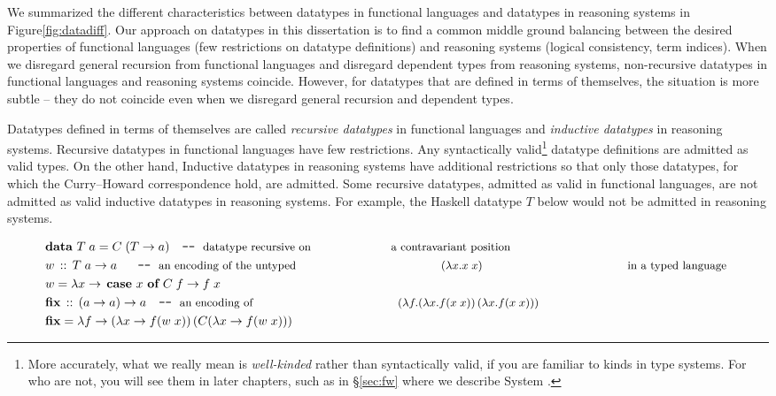 We summarized the different characteristics between datatypes
in functional languages and datatypes in reasoning systems
in Figure\;\ref{fig:datadiff}. Our approach on datatypes
in this dissertation is to find a common middle ground
balancing between the desired properties of functional languages
(few restrictions on datatype definitions) and reasoning systems
(logical consistency, term indices). When we disregard general recursion
from functional languages and disregard dependent types from reasoning systems,
non-recursive datatypes in functional languages and reasoning systems coincide. However, for datatypes that are defined in terms of themselves, the situation
is more subtle -- they do not coincide even when we disregard general recursion
and dependent types.

Datatypes defined in terms of themselves are called \emph{recursive datatypes}
in functional languages and \emph{inductive datatypes} in reasoning systems.
Recursive datatypes in functional languages have few restrictions.
Any syntactically valid\footnote{
	More accurately, what we really mean is \emph{well-kinded} rather than
	syntactically valid, if you are familiar to kinds in type systems.
	For who are not, you will see them in later chapters, such as
	in \S\ref{sec:fw} where we describe System \Fw.}
datatype definitions are admitted as valid types. On the other hand,
Inductive datatypes in reasoning systems have additional restrictions so that
only those datatypes, for which the Curry--Howard correspondence hold, are
admitted. Some recursive datatypes, admitted as valid in functional languages,
are not admitted as valid inductive datatypes in reasoning systems. For example,
the Haskell datatype $T$ below would not be admitted in reasoning systems.
\begin{singlespace}
\begin{align*}
& \textbf{data}~T\;a = C\;(T -> a) \quad
          \texttt{-}\texttt{-}~\text{\small datatype recursive on
	  				a contravariant position} \\
& w \,::\, T\;a -> a ~~ \quad
          \texttt{-}\texttt{-}~\text{\small an encoding of the untyped
                                     $(\lambda x.x\;x)$
                                     in a typed language}~ \\
& w = \lambda x -> \,\textbf{case}~x~\textbf{of}~C\;f -> f\;x \\
& \textbf{fix} \,::\, (a -> a) -> a \quad
          \texttt{-}\texttt{-}~\text{\small an encoding of 
                                     $(\lambda f.(\lambda x.f(x\;x))\,
                                                 (\lambda x.f(x\;x)))$} \\
& \textbf{fix} = \lambda f -> (\lambda x -> f (w\;x))\,(C(\lambda x -> f (w\;x)))
\end{align*}
\end{singlespace}\noindent
